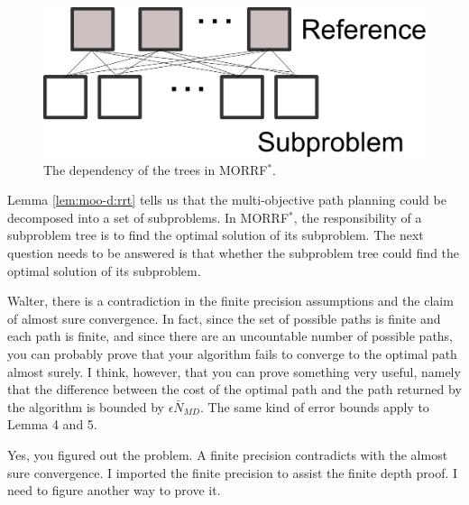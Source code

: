 \documentclass{article}
\begin{document}
\begin{figure}
\centering
\includegraphics[width=0.7\linewidth]{fig/dependency}
\caption{The dependency of the trees in MORRF$^{*}$.}
\label{fig:dependency}
\end{figure}

Lemma \ref{lem:moo-d:rrt} tells us that the multi-objective path planning could be decomposed into a set of subproblems.
In MORRF$^{*}$, the responsibility of a subproblem tree is to find the optimal solution of its subproblem.
The next question needs to be answered is that whether the subproblem tree could find the optimal solution of its subproblem.


{\sc Walter, there is a contradiction in the finite precision assumptions and the claim of almost sure convergence.  In fact, since the set of possible paths is finite and each path is finite, and since there are an uncountable number of possible paths, you can probably prove that your algorithm fails to converge to the optimal path almost surely.  I think, however, that you can prove something very useful, namely that the difference between the cost of the optimal path and the path returned by the algorithm is bounded by $\epsilon \bar{N}_{MD}$.  The same kind of error bounds apply to Lemma 4 and 5.}

{\sc Yes, you figured out the problem. A finite precision contradicts with the almost sure convergence. 
I imported the finite precision to assist the finite depth proof. 
I need to figure another way to prove it.
}
\end{document}
